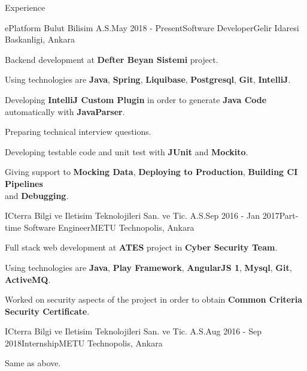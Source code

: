\documentclass{resume} %
\begin{document}
\begin{rSection}{Experience}

\begin{rSubsection}{ePlatform Bulut Bilisim A.S.}{May 2018 - Present}{Software Developer}{Gelir Idaresi Baskanligi, Ankara}
\item Backend development at \textbf{Defter Beyan Sistemi} project.
\item Using technologies are \textbf{Java}, \textbf{Spring}, \textbf{Liquibase}, \textbf{Postgresql}, \textbf{Git}, \textbf{IntelliJ}.
\item Developing \textbf{IntelliJ Custom Plugin} in order to generate \textbf{Java Code} automatically with \textbf{JavaParser}.
\item Preparing technical interview questions.
\item Developing testable code and unit test with \textbf{JUnit} and \textbf{Mockito}.
\item Giving support to \textbf{Mocking Data}, \textbf{Deploying to Production}, \textbf{Building CI Pipelines} \\
and \textbf{Debugging}.
\end{rSubsection}


\begin{rSubsection}{ICterra Bilgi ve Iletisim Teknolojileri San. ve Tic. A.S.}{Sep 2016 - Jan 2017}{Part-time Software Engineer}{METU Technopolis, Ankara}
\item Full stack web development at \textbf{ATES} project in \textbf{Cyber Security Team}.
\item Using technologies are \textbf{Java}, \textbf{Play Framework}, \textbf{AngularJS 1}, \textbf{Mysql}, \textbf{Git}, \textbf{ActiveMQ}.
\item Worked on security aspects of the project in order to obtain \textbf{Common Criteria Security Certificate}.
\end{rSubsection}


\begin{rSubsection}{ICterra Bilgi ve Iletisim Teknolojileri San. ve Tic. A.S.}{Aug 2016 - Sep 2018}{Internship}{METU Technopolis, Ankara}
\item Same as above.
\end{rSubsection}

\leavevmode \\\\\\\\


\end{rSection}
\end{document}
